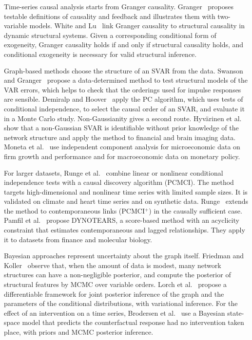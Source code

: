   Time-series causal analysis starts from Granger causality.
  Granger~\cite{granger1969investigating} proposes testable definitions of causality and
  feedback and illustrates them with two-variable models. White and Lu~\cite{white2010granger}
  link Granger causality to structural causality in dynamic structural systems.
  Given a corresponding conditional form of exogeneity, Granger causality holds
  if and only if structural causality holds, and conditional exogeneity is
  necessary for valid structural inference.

  Graph-based methods choose the structure of an SVAR from the data.
  Swanson and Granger~\cite{swanson1997impulse} propose a data-determined method to test structural
  models of the VAR errors, which helps to check that the orderings used for
  impulse responses are sensible. Demiralp and Hoover~\cite{demiralp2003searching} apply the PC
  algorithm, which uses tests of conditional independence, to select the causal
  order of an SVAR, and evaluate it in a Monte Carlo study. Non-Gaussianity
  gives a second route. Hyv{\"a}rinen et al.~\cite{hyvarinen2010var} show that a non-Gaussian SVAR is
  identifiable without prior knowledge of the network structure and apply the
  method to financial and brain imaging data. Moneta et al.~\cite{moneta2013causal} use
  independent component analysis for microeconomic data on firm growth and
  performance and for macroeconomic data on monetary policy.

  For larger datasets, Runge et al.~\cite{runge2019pcmci} combine linear or nonlinear
  conditional independence tests with a causal discovery algorithm (PCMCI).
  The method targets high-dimensional and nonlinear time series with limited
  sample sizes. It is validated on climate and heart time series and on
  synthetic data. Runge~\cite{runge2020pcmciplus} extends the method to contemporaneous
  links (PCMCI$^{+}$) in the causally sufficient case. Pamfil et al.~\cite{pamfil2020dynotears}
  propose DYNOTEARS, a score-based method with an acyclicity constraint that
  estimates contemporaneous and lagged relationships. They apply it to datasets
  from finance and molecular biology.

  Bayesian approaches represent uncertainty about the graph itself.
  Friedman and Koller~\cite{friedman2003being} observe that, when the amount of data is modest,
  many network structures can have a non-negligible posterior, and compute the
  posterior of structural features by MCMC over variable orders.
  Lorch et al.~\cite{lorch2021dibs} propose a differentiable framework for joint posterior
  inference of the graph and the parameters of the conditional distributions,
  with variational inference. For the effect of an intervention on a time
  series, Brodersen et al.~\cite{brodersen2015inferring} use a Bayesian state-space model that
  predicts the counterfactual response had no intervention taken place, with
  priors and MCMC posterior inference.

